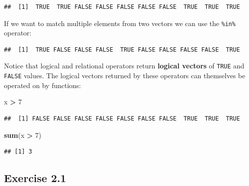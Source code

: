 \documentclass[
]{book}
\newenvironment{Shaded}{\begin{snugshade}}{\end{snugshade}}
\newcommand{\CommentTok}[1]{\textcolor[rgb]{0.56,0.35,0.01}{\textit{#1}}}
\newcommand{\DecValTok}[1]{\textcolor[rgb]{0.00,0.00,0.81}{#1}}
\newcommand{\KeywordTok}[1]{\textcolor[rgb]{0.13,0.29,0.53}{\textbf{#1}}}
\newcommand{\NormalTok}[1]{#1}
\newcommand{\OperatorTok}[1]{\textcolor[rgb]{0.81,0.36,0.00}{\textbf{#1}}}
\newcommand{\StringTok}[1]{\textcolor[rgb]{0.31,0.60,0.02}{#1}}
\begin{document}
\begin{verbatim}
##  [1]  TRUE  TRUE FALSE FALSE FALSE FALSE FALSE  TRUE  TRUE  TRUE
\end{verbatim}

If we want to match multiple elements from two vectors we can use the \texttt{\%in\%} operator:

\begin{Shaded}
\end{Shaded}

\begin{verbatim}
##  [1]  TRUE FALSE FALSE FALSE  TRUE FALSE FALSE FALSE FALSE  TRUE
\end{verbatim}

Notice that logical and relational operators return \textbf{logical vectors} of \texttt{TRUE} and \texttt{FALSE} values.
The logical vectors returned by these operators can themselves be operated on by functions:

\begin{Shaded}
\begin{Highlighting}[]
\NormalTok{x }\OperatorTok{>}\StringTok{ }\DecValTok{7}
\end{Highlighting}
\end{Shaded}

\begin{verbatim}
##  [1] FALSE FALSE FALSE FALSE FALSE FALSE FALSE  TRUE  TRUE  TRUE
\end{verbatim}

\begin{Shaded}
\begin{Highlighting}[]
\KeywordTok{sum}\NormalTok{(x }\OperatorTok{>}\StringTok{ }\DecValTok{7}\NormalTok{)}
\end{Highlighting}
\end{Shaded}

\begin{verbatim}
## [1] 3
\end{verbatim}

\hypertarget{exercise-2.1}{%
\subsection{Exercise 2.1}\label{exercise-2.1}}
\end{document}
